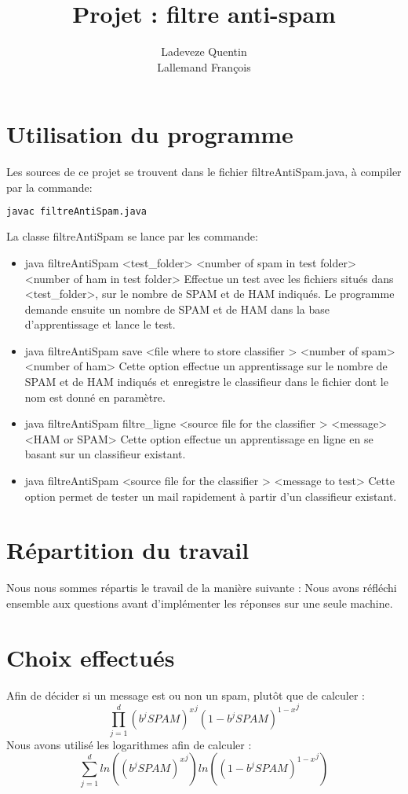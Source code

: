 \documentclass[a4paper, 11pt]{article}
\title{Projet : filtre anti-spam}
\author{Ladeveze Quentin\\Lallemand François}
\begin{document}
\maketitle


\section{Utilisation du programme}
Les sources de ce projet se trouvent dans le fichier filtreAntiSpam.java, à compiler par la commande:
\begin{lstlisting}[language=bash]
  javac filtreAntiSpam.java
\end{lstlisting}
La classe filtreAntiSpam se lance par les commande:
\begin{itemize}[label=\textbullet]
\item java filtreAntiSpam <test\_folder> <number of spam in test folder> <number of ham in test folder>
  Effectue un test avec les fichiers situés dans <test\_folder>, sur le nombre de SPAM et de HAM indiqués. Le programme demande ensuite un nombre de SPAM et de HAM dans la base d'apprentissage et lance le test.
\item java filtreAntiSpam save <file where to store classifier > <number of spam> <number of ham>
  Cette option effectue un apprentissage sur le nombre de SPAM et de HAM indiqués et enregistre le classifieur dans le fichier dont le nom est donné en paramètre.
\item java filtreAntiSpam filtre\_ligne <source file for the classifier > <message> <HAM or SPAM>
  Cette option effectue un apprentissage en ligne en se basant sur un classifieur existant.
\item java filtreAntiSpam <source file for the classifier > <message to test>
  Cette option permet de tester un mail rapidement à partir d'un classifieur existant.
\end{itemize}

\section{Répartition du travail}
Nous nous sommes répartis le travail de la manière suivante :
Nous avons réfléchi ensemble aux questions avant d'implémenter les réponses sur une seule machine.

\section{Choix effectués}
Afin de décider si un message est ou non un spam, plutôt que de calculer :
\[ \prod\limits_{j=1}^d {(b^jSPAM)^x}^j {(1-b^jSPAM)^{1-x}}^j \]
Nous avons utilisé les logarithmes afin de calculer :
\[ \sum\limits_{j=1}^d ln({(b^jSPAM)^x}^j) ln({(1-b^jSPAM)^{1-x}}^j) \]
\end{document}

